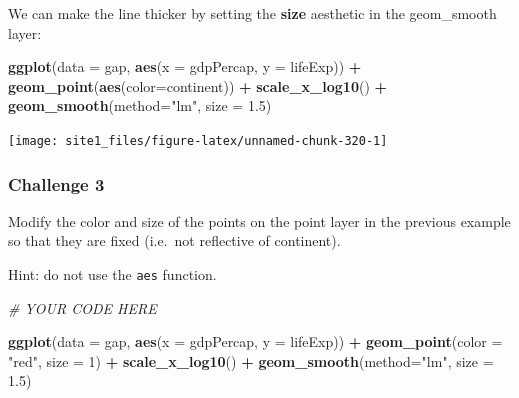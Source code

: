 \documentclass[]{book}
\newenvironment{Shaded}{\begin{snugshade}}{\end{snugshade}}
\newcommand{\KeywordTok}[1]{\textcolor[rgb]{0.13,0.29,0.53}{\textbf{#1}}}
\newcommand{\DataTypeTok}[1]{\textcolor[rgb]{0.13,0.29,0.53}{#1}}
\newcommand{\DecValTok}[1]{\textcolor[rgb]{0.00,0.00,0.81}{#1}}
\newcommand{\FloatTok}[1]{\textcolor[rgb]{0.00,0.00,0.81}{#1}}
\newcommand{\StringTok}[1]{\textcolor[rgb]{0.31,0.60,0.02}{#1}}
\newcommand{\CommentTok}[1]{\textcolor[rgb]{0.56,0.35,0.01}{\textit{#1}}}
\newcommand{\OperatorTok}[1]{\textcolor[rgb]{0.81,0.36,0.00}{\textbf{#1}}}
\newcommand{\NormalTok}[1]{#1}
\begin{document}
We can make the line thicker by setting the \textbf{size} aesthetic in
the geom\_smooth layer:

\begin{Shaded}
\begin{Highlighting}[]
\KeywordTok{ggplot}\NormalTok{(}\DataTypeTok{data =}\NormalTok{ gap, }\KeywordTok{aes}\NormalTok{(}\DataTypeTok{x =}\NormalTok{ gdpPercap, }\DataTypeTok{y =}\NormalTok{ lifeExp)) }\OperatorTok{+}\StringTok{ }
\StringTok{  }\KeywordTok{geom_point}\NormalTok{(}\KeywordTok{aes}\NormalTok{(}\DataTypeTok{color=}\NormalTok{continent)) }\OperatorTok{+}\StringTok{ }
\StringTok{  }\KeywordTok{scale_x_log10}\NormalTok{() }\OperatorTok{+}\StringTok{ }
\StringTok{  }\KeywordTok{geom_smooth}\NormalTok{(}\DataTypeTok{method=}\StringTok{"lm"}\NormalTok{, }\DataTypeTok{size =} \FloatTok{1.5}\NormalTok{)}
\end{Highlighting}
\end{Shaded}

\begin{center}\texttt{[image: site1\_files/figure-latex/unnamed-chunk-320-1]} \end{center}

\subsubsection*{Challenge 3}\label{challenge-3}

Modify the color and size of the points on the point layer in the
previous example so that they are fixed (i.e.~not reflective of
continent).

Hint: do not use the \texttt{aes} function.

\begin{Shaded}
\begin{Highlighting}[]
\CommentTok{# YOUR CODE HERE}

\KeywordTok{ggplot}\NormalTok{(}\DataTypeTok{data =}\NormalTok{ gap, }\KeywordTok{aes}\NormalTok{(}\DataTypeTok{x =}\NormalTok{ gdpPercap, }\DataTypeTok{y =}\NormalTok{ lifeExp)) }\OperatorTok{+}\StringTok{ }
\StringTok{  }\KeywordTok{geom_point}\NormalTok{(}\DataTypeTok{color =} \StringTok{"red"}\NormalTok{, }\DataTypeTok{size =} \DecValTok{1}\NormalTok{) }\OperatorTok{+}\StringTok{ }
\StringTok{  }\KeywordTok{scale_x_log10}\NormalTok{() }\OperatorTok{+}\StringTok{ }
\StringTok{  }\KeywordTok{geom_smooth}\NormalTok{(}\DataTypeTok{method=}\StringTok{"lm"}\NormalTok{, }\DataTypeTok{size =} \FloatTok{1.5}\NormalTok{)}
\end{Highlighting}
\end{Shaded}
\end{document}
